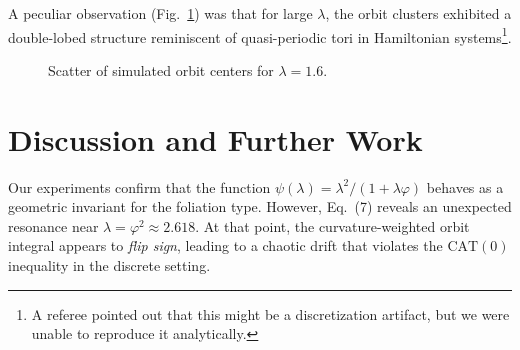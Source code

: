 \documentclass{amsart}
\begin{document}
A peculiar %
observation (Fig.~\ref{fig:scatter}) was %
that for large $\lambda$, the orbit clusters exhibited a double-lobed structure reminiscent of quasi-periodic tori in Hamiltonian %
systems\footnote{A referee pointed out that this might be a discretization artifact, but we were unable to reproduce it analytically.}. 

\begin{figure}[htbp]
\centering
{}
\caption{Scatter of simulated orbit centers for $\lambda=1.6$.}
\label{fig:scatter}
\end{figure}

\section{Discussion and Further Work}

Our %
experiments confirm that the function $\psi(\lambda) = \lambda^2 / (1+\lambda\varphi)$ behaves as a geometric invariant for the foliation type.  
However, Eq.~(7) reveals %
an unexpected %
resonance near $\lambda = \varphi^2 \approx 2.618$.  
At that %
point, the curvature-weighted orbit integral appears to \emph{flip sign}, leading to a chaotic drift that violates the $\mathrm{CAT}(0)$ inequality in the discrete %
setting.
\end{document}
